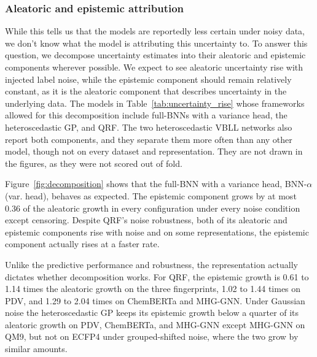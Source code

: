 \subsubsection{Aleatoric and epistemic attribution}

While this tells us that the models are reportedly less certain under noisy data, we don't know what the model is attributing this uncertainty to. To answer this question, we decompose uncertainty estimates into their aleatoric and epistemic components wherever possible. We expect to see aleatoric uncertainty rise with injected label noise, while the epistemic component should remain relatively constant, as it is the aleatoric component that describes uncertainty in the underlying data. The models in Table~\ref{tab:uncertainty_rise} whose frameworks allowed for this decomposition include full-BNNs with a variance head, the heteroscedastic GP, and QRF. The two heteroscedastic VBLL networks also report both components, and they separate them more often than any other model, though not on every dataset and representation. They are not drawn in the figures, as they were not scored out of fold.

Figure~\ref{fig:decomposition} shows that the full-BNN with a variance head, BNN-$\alpha$ (var. head), behaves as expected. The epistemic component grows by at most 0.36 of the aleatoric growth in every configuration under every noise condition except censoring. Despite QRF's noise robustness, both of its aleatoric and epistemic components rise with noise and on some representations, the epistemic component actually rises at a faster rate.

Unlike the predictive performance and robustness, the representation actually dictates whether decomposition works. For QRF, the epistemic growth is 0.61 to 1.14 times the aleatoric growth on the three fingerprints, 1.02 to 1.44 times on PDV, and 1.29 to 2.04 times on ChemBERTa and MHG-GNN. Under Gaussian noise the heteroscedastic GP keeps its epistemic growth below a quarter of its aleatoric growth on PDV, ChemBERTa, and MHG-GNN except MHG-GNN on QM9, but not on ECFP4 under grouped-shifted noise, where the two grow by similar amounts.

